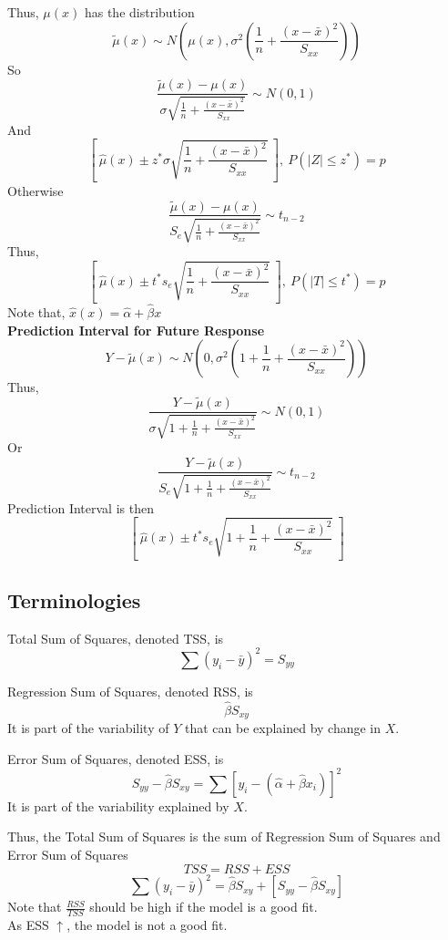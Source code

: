 \documentclass[12pt, leqno]{article}
\theoremstyle{definition}
\begin{document}
  Thus, $\mu(x)$ has the distribution
  $$\widetilde{\mu}(x) \sim N\left(\mu(x), \sigma^{2}\left(\frac{1}{n} + \frac{(x - \bar{x})^{2}}{S_{xx}}\right)\right)$$
  So
  $$\frac{\widetilde{\mu}(x) - \mu(x)}{\sigma\sqrt{\frac{1}{n} + \frac{(x - \bar{x})^{2}}{S_{xx}}}} \sim N(0, 1)$$
  And
  $$\left[~\hat{\mu}(x) \pm z^{*}\sigma\sqrt{\frac{1}{n} + \frac{(x - \bar{x})^{2}}{S_{xx}}}~\right], ~P(|Z| \leq z^{*}) = p$$
  \newline
  Otherwise
  $$\frac{\widetilde{\mu}(x) - \mu(x)}{S_{e}\sqrt{\frac{1}{n} + \frac{(x - \bar{x})^{2}}{S_{xx}}}} \sim t_{n-2}$$
  Thus,
  $$\left[~\hat{\mu}(x) \pm t^{*}s_{e}\sqrt{\frac{1}{n} + \frac{(x - \bar{x})^{2}}{S_{xx}}}~\right], ~P(|T| \leq t^{*}) = p$$
  \newline
  Note that, $\hat{x}(x) = \hat{\alpha} + \hat{\beta}x$ \\
  \newline
  \textbf{Prediction Interval for Future Response} \\
  $$Y - \widetilde{\mu}(x) \sim N\left(0, \sigma^{2}\left(1 + \frac{1}{n} + \frac{(x - \bar{x})^{2}}{S_{xx}}\right)\right)$$
  Thus,
  $$\frac{Y - \widetilde{\mu}(x)}{\sigma\sqrt{1 + \frac{1}{n} + \frac{(x - \bar{x})^{2}}{S_{xx}}}} \sim N(0, 1)$$
  Or
  $$\frac{Y - \widetilde{\mu}(x)}{S_{e}\sqrt{1 + \frac{1}{n} + \frac{(x - \bar{x})^{2}}{S_{xx}}}} \sim t_{n-2}$$
  \newline
  Prediction Interval is then
  $$\left[~\hat{\mu}(x) \pm t^{*}s_{e}\sqrt{1 + \frac{1}{n} + \frac{(x - \bar{x})^{2}}{S_{xx}}} ~\right]$$

  \subsection{Terminologies}
  Total Sum of Squares, denoted TSS, is
  $$\sum (y_{i} - \bar{y})^{2} = S_{yy}$$

  Regression Sum of Squares, denoted RSS, is
  $$\hat{\beta}S_{xy}$$
  It is part of the variability of $Y$ that can be explained by change in $X$.

  Error Sum of Squares, denoted ESS, is
  $$S_{yy} - \hat{\beta}S_{xy} = \sum [y_{i} - (\hat{\alpha} + \hat{\beta}x_{i})]^{2}$$
  It is part of the variability explained by $X$.

  Thus, the Total Sum of Squares is the sum of Regression Sum of Squares and Error Sum of Squares
  $$TSS = RSS + ESS$$
  $$\sum (y_{i} - \bar{y})^{2} = \hat{\beta}S_{xy} + [S_{yy} - \hat{\beta}S_{xy}]$$
  Note that $\frac{RSS}{TSS}$ should be high if the model is a good fit. \\
  As ESS $\uparrow$, the model is not a good fit.
\end{document}

